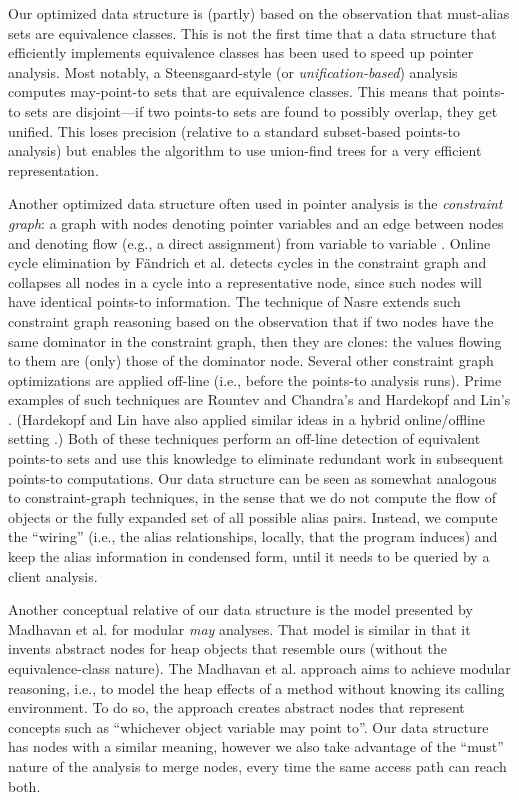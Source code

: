 Our optimized data structure is (partly) based on the observation that must-alias sets are equivalence classes. This is not the first time that a data structure that efficiently implements equivalence classes has been used to speed up pointer analysis. Most notably, a Steensgaard-style (or \emph{unification-based}) \cite{popl:1996:Steensgaard} analysis computes may-point-to sets that are equivalence classes. This means that points-to sets are disjoint---if two points-to sets are found to possibly overlap, they get unified. This loses precision (relative to a standard subset-based points-to analysis) but enables the algorithm to use union-find trees for a very efficient representation.

Another optimized data structure often used in pointer analysis is the \emph{constraint graph}: a graph with nodes denoting pointer variables and an edge between nodes  and  denoting flow (e.g., a direct assignment) from variable  to variable . Online cycle elimination by F\"{a}ndrich et al. \cite{pldi:1998:Fahndrich} detects cycles in the constraint graph and collapses all nodes in a cycle into a representative node, since such nodes will have identical points-to information. The technique of Nasre \cite{ismm:2012:Nasre} extends such constraint graph reasoning based on the observation that if two nodes have the same dominator in the constraint graph, then they are clones: the values flowing to them are (only) those of the dominator node. Several other constraint graph optimizations are applied off-line (i.e., before the points-to analysis runs). Prime examples of such techniques are Rountev and Chandra's \cite{pldi:2000:Rountev} and Hardekopf and Lin's \cite{sas:2007:Hardekopf}. (Hardekopf and Lin have also applied similar ideas in a hybrid online/offline setting \cite{pldi:2007:Hardekopf}.) Both of these techniques perform an off-line detection of equivalent points-to sets and use this knowledge to eliminate redundant work in subsequent points-to computations. Our data structure can be seen as somewhat analogous to constraint-graph techniques, in the sense that we do not compute the flow of objects or the fully expanded set of all possible alias pairs. Instead, we compute the ``wiring'' (i.e., the alias relationships, locally, that the program induces) and keep the alias information in condensed form, until it needs to be queried by a client analysis.

Another conceptual relative of our data structure is the model presented by Madhavan et al. \cite{article:2015:Madhavan} for modular \emph{may} analyses. That model is similar in that it invents abstract nodes for heap objects that resemble ours (without the equivalence-class nature). The Madhavan et al. approach aims to achieve modular reasoning, i.e., to model the heap effects of a method without knowing its calling environment. To do so, the approach creates abstract nodes that represent concepts such as ``whichever object variable  may point to''. Our data structure has nodes with a similar meaning, however we also take advantage of the ``must'' nature of the analysis to merge nodes, every time the same access path can reach both.



